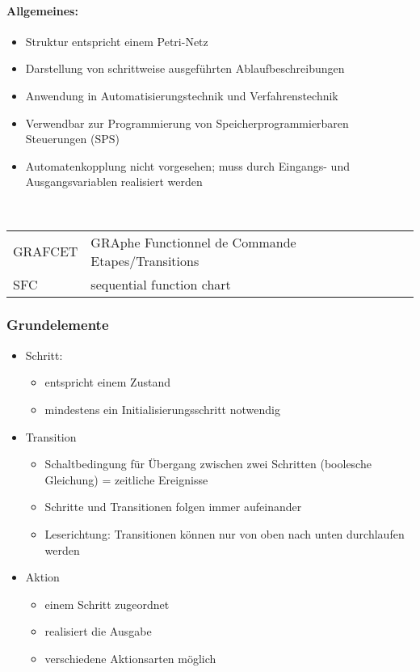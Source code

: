	\paragraph{Allgemeines:}
	\begin{itemize}
		\item Struktur entspricht einem Petri-Netz
		\item Darstellung von schrittweise ausgeführten Ablaufbeschreibungen
		\item Anwendung in Automatisierungstechnik und Verfahrenstechnik
		\item Verwendbar zur Programmierung von Speicherprogrammierbaren Steuerungen (SPS)
		\item Automatenkopplung nicht vorgesehen; muss durch Eingangs- und Ausgangsvariablen realisiert werden
	\end{itemize}
	\hfill\\
	\begin{tabular}{ll}
		GRAFCET & GRAphe Functionnel de Commande Etapes/Transitions\\
		SFC & sequential function chart
	\end{tabular}
	
	
	\subsubsection{Grundelemente}
		\begin{itemize}
			\item Schritt:
				\begin{itemize}
					\item entspricht einem Zustand
					\item mindestens ein Initialisierungsschritt notwendig
				\end{itemize}
			\item Transition
				\begin{itemize}
					\item Schaltbedingung für Übergang zwischen zwei Schritten (boolesche Gleichung) = zeitliche Ereignisse
					\item Schritte und Transitionen folgen immer aufeinander
					\item Leserichtung: Transitionen können nur von oben nach unten durchlaufen werden
				\end{itemize}
			\item Aktion
				\begin{itemize}
					\item einem Schritt zugeordnet
					\item realisiert die Ausgabe
					\item verschiedene Aktionsarten möglich
				\end{itemize}
		\end{itemize}
	

